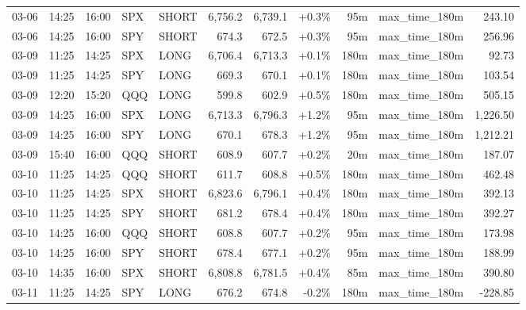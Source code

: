 \documentclass[11pt,a4paper,twoside]{article}
\begin{document}
\begin{center}
\begin{longtable}{>{\color{txtmain}}l l l l l r r r r >{\color{txtmain}}l r}
03-06 & 14:25 & 16:00 & SPX & SHORT & 6,756.2 & 6,739.1 & \textcolor{wingreen}{+0.3\%} & 95m & max\_time\_180m & \textcolor{wingreen}{243.10} \\
03-06 & 14:25 & 16:00 & SPY & SHORT & 674.3 & 672.5 & \textcolor{wingreen}{+0.3\%} & 95m & max\_time\_180m & \textcolor{wingreen}{256.96} \\
03-09 & 11:25 & 14:25 & SPX & LONG & 6,706.4 & 6,713.3 & \textcolor{wingreen}{+0.1\%} & 180m & max\_time\_180m & \textcolor{wingreen}{92.73} \\
03-09 & 11:25 & 14:25 & SPY & LONG & 669.3 & 670.1 & \textcolor{wingreen}{+0.1\%} & 180m & max\_time\_180m & \textcolor{wingreen}{103.54} \\
03-09 & 12:20 & 15:20 & QQQ & LONG & 599.8 & 602.9 & \textcolor{wingreen}{+0.5\%} & 180m & max\_time\_180m & \textcolor{wingreen}{505.15} \\
03-09 & 14:25 & 16:00 & SPX & LONG & 6,713.3 & 6,796.3 & \textcolor{wingreen}{+1.2\%} & 95m & max\_time\_180m & \textcolor{wingreen}{1,226.50} \\
03-09 & 14:25 & 16:00 & SPY & LONG & 670.1 & 678.3 & \textcolor{wingreen}{+1.2\%} & 95m & max\_time\_180m & \textcolor{wingreen}{1,212.21} \\
03-09 & 15:40 & 16:00 & QQQ & SHORT & 608.9 & 607.7 & \textcolor{wingreen}{+0.2\%} & 20m & max\_time\_180m & \textcolor{wingreen}{187.07} \\
03-10 & 11:25 & 14:25 & QQQ & SHORT & 611.7 & 608.8 & \textcolor{wingreen}{+0.5\%} & 180m & max\_time\_180m & \textcolor{wingreen}{462.48} \\
03-10 & 11:25 & 14:25 & SPX & SHORT & 6,823.6 & 6,796.1 & \textcolor{wingreen}{+0.4\%} & 180m & max\_time\_180m & \textcolor{wingreen}{392.13} \\
03-10 & 11:25 & 14:25 & SPY & SHORT & 681.2 & 678.4 & \textcolor{wingreen}{+0.4\%} & 180m & max\_time\_180m & \textcolor{wingreen}{392.27} \\
03-10 & 14:25 & 16:00 & QQQ & SHORT & 608.8 & 607.7 & \textcolor{wingreen}{+0.2\%} & 95m & max\_time\_180m & \textcolor{wingreen}{173.98} \\
03-10 & 14:25 & 16:00 & SPY & SHORT & 678.4 & 677.1 & \textcolor{wingreen}{+0.2\%} & 95m & max\_time\_180m & \textcolor{wingreen}{188.99} \\
03-10 & 14:35 & 16:00 & SPX & SHORT & 6,808.8 & 6,781.5 & \textcolor{wingreen}{+0.4\%} & 85m & max\_time\_180m & \textcolor{wingreen}{390.80} \\
03-11 & 11:25 & 14:25 & SPY & LONG & 676.2 & 674.8 & \textcolor{lossred}{-0.2\%} & 180m & max\_time\_180m & \textcolor{lossred}{-228.85} \\

\end{longtable}
\end{center}
\end{document}
